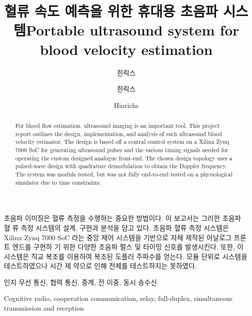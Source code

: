 \documentclass[master,english,final]{kaist-ucs}
\title[korean] {혈류 속도 예측을 위한 휴대용 초음파 시스템}
\title[english]{Portable ultrasound system for blood velocity estimation}
\author[korean]{힌릭스}{예페}
\author[korean2]{힌릭스}{예페}   %
\author[chinese]{}{}
\author[english]{Hinrichs}{Jeppe}
\begin{document}

	\thesisinfo
	\begin{summary}
		초음파 이미징은 혈류 측정을 수행하는 중요한 방법이다. 이 보고서는 그러한 초음파 혈 류 측정 시스템의 설계, 구현과 분석을 담고 있다. 초음파 혈류 측정 시스템은 Xilinx Zynq	7000 SoC 라는 중앙 제어 시스템을 기반으로 자체 제작된 아날로그 프론트 엔드를 구현하	기 위한 다양한 초음파 펄스 및 타이밍 신호를 발생시킨다. 또한, 이 시스템은 직교 복조를 이용하여 복조된 도플러 주파수를 얻는다. 모듈 단위로 시스템을 테스트하였으나 시간 제 약으로 인해 전체를 테스트하지는 못하였다.
	\end{summary}

	\begin{Korkeyword}
		인지 무선 통신, 협력 통신, 중계, 전 이중, 동시 송수신
	\end{Korkeyword}


	\begin{abstract}
		For blood flow estimation, ultrasound imaging is an important tool. This project report outlines the design, implementation, and analysis of such ultrasound blood velocity estimator. The design is based off a central control system on a Xilinx Zynq 7000 SoC for generating ultrasound pulses and the various timing signals needed for operating the custom designed analogue front-end. The chosen design topology uses a pulsed-wave design with quadrature demodulation to obtain the Doppler frequency. The system was module tested, but was not fully end-to-end tested on a physiological simulator due to time constraints.
	\end{abstract}

	\begin{Engkeyword}
		Cognitive radio, cooperation communication, relay, full-duplex, simultaneous transmission and reception
	\end{Engkeyword}


	\addtocounter{pagemarker}{1}                 %
	\newpage
\end{document}
